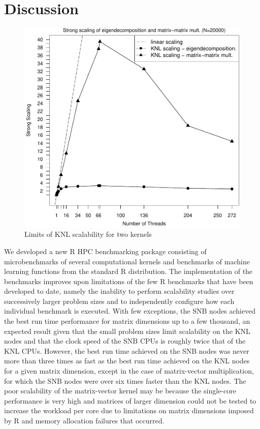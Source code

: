 \section{Discussion} \label{sec:discuss}
\begin{figure}
\includegraphics[height=\columnwidth, width=\columnwidth]{eigen_matmat_20000_272_knl-ss.pdf}
\caption{Limits of KNL scalability for two kernels}
\label{fig:knlScalabilityLimits}
\end{figure}
We developed a new R HPC benchmarking package consisting of microbenchmarks of several
computational kernels and benchmarks of machine learning functions from the standard R
distribution. The implementation of the benchmarks improves upon limitations of the few R
benchmarks that have been developed to date, namely the inability to perform scalability
studies over successively larger problem sizes and to independently configure how each
individual benchmark is executed. With few exceptions, the SNB nodes achieved the best run
time performance for matrix dimensions up to a few thousand, an expected result given that
the small problem sizes limit scalability on the KNL nodes and that the clock speed of the
SNB CPUs is roughly twice that of the KNL CPUs. However, the best run time achieved on the
SNB nodes was never more than three times as fast as the best run time achieved on the KNL
nodes for a given matrix dimension, except in the case of matrix-vector multiplication,
for which the SNB nodes were over six times faster than the KNL nodes. The poor
scalability of the matrix-vector kernel may be because the single-core performance is very
high and matrices of larger dimension could not be tested to increase the workload per
core due to limitations on matrix dimensions imposed by R and memory allocation failures
that occurred.

